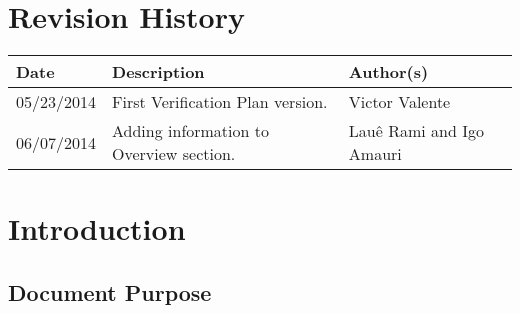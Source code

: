 \documentclass{article}
\begin{document}
  \section*{\center Revision History}
  \vspace*{1cm}
  \begin{center} %
    \begin{longtable}[pos]{|m{2cm} | m{7.2cm} | m{3.8cm}|} 
      \hline %
      \cellcolor[gray]{0.9}
      \textbf{Date} & \cellcolor[gray]{0.9}\textbf{Description} & \cellcolor[gray]{0.9}\textbf{Author(s)}\\ \hline
      \hline
      \small 05/23/2014 & \small First Verification Plan version. & \small Victor Valente \\ \hline
      \small 06/07/2014 & \small Adding information to Overview section. & \small Lauê Rami and Igo Amauri \\ \hline
    \end{longtable}
  \end{center}

  \newpage
  \tableofcontents
  \newpage

  \section{Introduction}

	\subsection{Document Purpose}
	
\end{document}
